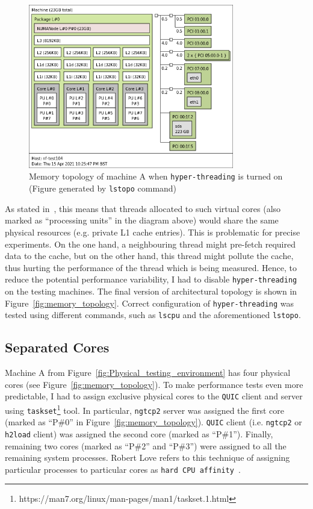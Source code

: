 \documentclass[12pt,a4paper,twoside,openright]{report}
\begin{document}
    \begin{figure}[H]
    \centering
    \includegraphics[width=0.8\textwidth]{figs/topology_with_hyperthreading.png}
    \caption[Memory topology of machine A when \texttt{hyper-threading} is turned on]{Memory topology of machine A when \texttt{hyper-threading} is turned on (Figure generated by \texttt{lstopo} command)}
    \label{fig:topology_with_hyperthreading}
    \end{figure}

As stated in~\cite{hyperthreading_book}, this means that threads allocated to such virtual cores (also marked as \enquote{processing units} in the diagram above) would share the same physical resources (e.g. private L1 cache entries).
This is problematic for precise experiments.
On the one hand, a neighbouring thread might pre-fetch required data to the cache, but on the other hand, this thread might pollute the cache, thus hurting the performance of the thread which is being measured.
Hence, to reduce the potential performance variability, I had to disable \texttt{hyper-threading} on the testing machines.
The final version of architectural topology is shown in Figure~\ref{fig:memory_topology}. 
Correct configuration of \texttt{hyper-threading} was tested using different commands, such as \texttt{lscpu} and the aforementioned \texttt{lstopo}. 

    
    
\subsection{Separated Cores} \label{SeparatedCores_Subsection_Tag}
Machine A from Figure~\ref{fig:Physical_testing_environment} has four physical cores (see Figure~\ref{fig:memory_topology}).
To make performance tests even more predictable, I had to assign exclusive physical cores to the \texttt{QUIC} client and server using \texttt{taskset}\footnote{https://man7.org/linux/man-pages/man1/taskset.1.html} tool.
In particular, \texttt{ngtcp2} server was assigned the first core (marked as \enquote{P\#0} in Figure~\ref{fig:memory_topology}).
\texttt{QUIC} client (i.e. \texttt{ngtcp2} or \texttt{h2load} client) was assigned the second core (marked as \enquote{P\#1}).
Finally, remaining two cores (marked as \enquote{P\#2} and \enquote{P\#3}) were assigned to all the remaining system processes.
Robert Love refers to this technique of assigning particular processes to particular cores as \texttt{hard CPU affinity}~\cite{CPU_Affinity}.
\end{document}
